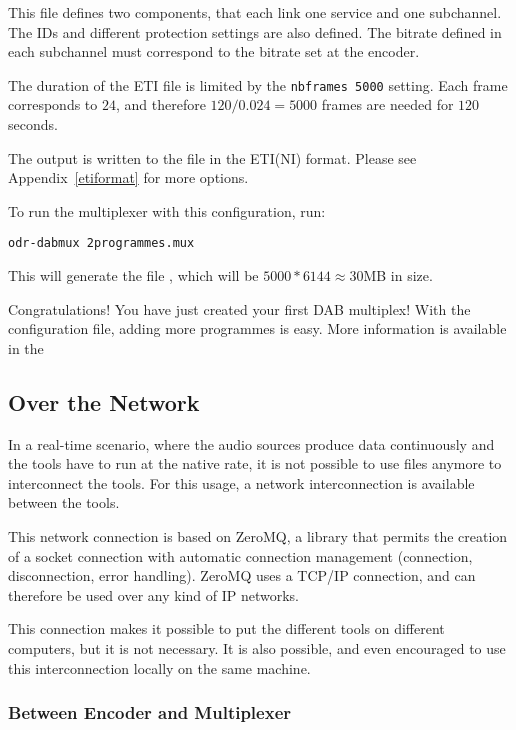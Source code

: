 This file defines two components, that each link one service and one
subchannel. The IDs and different protection settings are also defined.
The bitrate defined in each subchannel must correspond to the bitrate set at
the encoder.

The duration of the ETI file is limited by the \lstinline{nbframes 5000}
setting. Each frame corresponds to $24$\ms, and therefore $120 / 0.024 = 5000$
frames are needed for $120$ seconds.

The output is written to the file  in the ETI(NI) format.
Please see Appendix~\ref{etiformat} for more options.

To run the multiplexer with this configuration, run:
\begin{lstlisting}
odr-dabmux 2programmes.mux
\end{lstlisting}

This will generate the file , which will be $5000 * 6144
\approx 30$\si{MB} in size.

Congratulations! You have just created your first DAB multiplex! With the
configuration file, adding more programmes is easy. More information is
available in the 

\subsection{Over the Network}
In a real-time scenario, where the audio sources produce data continuously and
the tools have to run at the native rate, it is not possible to use files
anymore to interconnect the tools. For this usage, a network interconnection is
available between the tools.

This network connection is based on ZeroMQ, a library that permits the creation
of a socket connection with automatic connection management (connection,
disconnection, error handling).  ZeroMQ uses a TCP/IP connection, and can
therefore be used over any kind of IP networks.

This connection makes it possible to put the different tools on different
computers, but it is not necessary. It is also possible, and even encouraged to
use this interconnection locally on the same machine.

\subsubsection{Between Encoder and Multiplexer}

